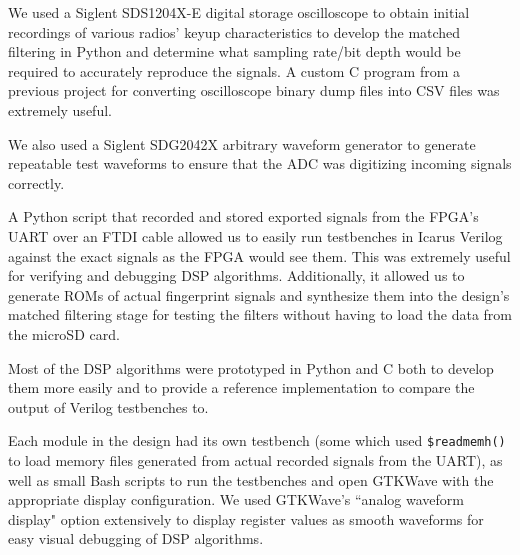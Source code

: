 \documentclass[conference]{IEEEtran}
\begin{document}
We used a Siglent SDS1204X-E digital storage oscilloscope to obtain initial recordings of various radios' keyup characteristics to develop the matched filtering in Python and determine what sampling rate/bit depth would be required to accurately reproduce the signals. A custom C program from a previous project for converting oscilloscope binary dump files into CSV files was extremely useful.

We also used a Siglent SDG2042X arbitrary waveform generator to generate repeatable test waveforms to ensure that the ADC was digitizing incoming signals correctly.

A Python script that recorded and stored exported signals from the FPGA's UART over an FTDI cable allowed us to easily run testbenches in Icarus Verilog against the exact signals as the FPGA would see them. This was extremely useful for verifying and debugging DSP algorithms. Additionally, it allowed us to generate ROMs of actual fingerprint signals and synthesize them into the design's matched filtering stage for testing the filters without having to load the data from the microSD card.

Most of the DSP algorithms were prototyped in Python and C both to develop them more easily and to provide a reference implementation to compare the output of Verilog testbenches to.

Each module in the design had its own testbench (some which used \lstinline{$readmemh()} to load memory files generated from actual recorded signals from the UART), as well as small Bash scripts to run the testbenches and open GTKWave with the appropriate display configuration. We used GTKWave's ``analog waveform display" option extensively to display register values as smooth waveforms for easy visual debugging of DSP algorithms.
\end{document}
